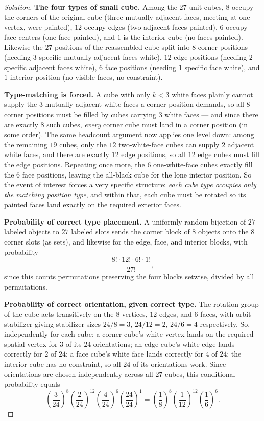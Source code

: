 \documentclass[11pt]{article}
\theoremstyle{definition}
\begin{document}
\begin{proof}[Solution]
\textbf{The four types of small cube.} Among the $27$ unit cubes, $8$ occupy the corners of the original cube (three mutually adjacent faces, meeting at one vertex, were painted), $12$ occupy edges (two adjacent faces painted), $6$ occupy face centers (one face painted), and $1$ is the interior cube (no faces painted). Likewise the $27$ positions of the reassembled cube split into $8$ corner positions (needing $3$ specific mutually adjacent faces white), $12$ edge positions (needing $2$ specific adjacent faces white), $6$ face positions (needing $1$ specific face white), and $1$ interior position (no visible faces, no constraint).

\textbf{Type-matching is forced.} A cube with only $k<3$ white faces plainly cannot supply the $3$ mutually adjacent white faces a corner position demands, so all $8$ corner positions must be filled by cubes carrying $3$ white faces — and since there are exactly $8$ such cubes, \emph{every} corner cube must land in a corner position (in some order). The same headcount argument now applies one level down: among the remaining $19$ cubes, only the $12$ two-white-face cubes can supply $2$ adjacent white faces, and there are exactly $12$ edge positions, so all $12$ edge cubes must fill the edge positions. Repeating once more, the $6$ one-white-face cubes exactly fill the $6$ face positions, leaving the all-black cube for the lone interior position. So the event of interest forces a very specific structure: \emph{each cube type occupies only the matching position type}, and within that, each cube must be rotated so its painted faces land exactly on the required exterior faces.

\textbf{Probability of correct type placement.} A uniformly random bijection of $27$ labeled objects to $27$ labeled slots sends the corner block of $8$ objects onto the $8$ corner slots (as sets), and likewise for the edge, face, and interior blocks, with probability
\[
\frac{8!\cdot12!\cdot6!\cdot1!}{27!},
\]
since this counts permutations preserving the four blocks setwise, divided by all permutations.

\textbf{Probability of correct orientation, given correct type.} The rotation group of the cube acts transitively on the $8$ vertices, $12$ edges, and $6$ faces, with orbit-stabilizer giving stabilizer sizes $24/8=3$, $24/12=2$, $24/6=4$ respectively. So, independently for each cube: a corner cube's white vertex lands on the required spatial vertex for $3$ of its $24$ orientations; an edge cube's white edge lands correctly for $2$ of $24$; a face cube's white face lands correctly for $4$ of $24$; the interior cube has no constraint, so all $24$ of its orientations work. Since orientations are chosen independently across all $27$ cubes, this conditional probability equals
\[
\left(\frac{3}{24}\right)^{8}\left(\frac{2}{24}\right)^{12}\left(\frac{4}{24}\right)^{6}\left(\frac{24}{24}\right)^{1}=\left(\frac18\right)^{8}\left(\frac1{12}\right)^{12}\left(\frac16\right)^{6}.
\]


\end{proof}
\end{document}

